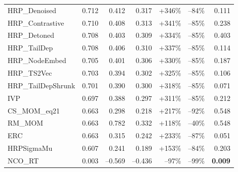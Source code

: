 \documentclass[11pt,a4paper]{article}
\begin{document}
\begin{table}[H]
\begin{tabular}{lrrrrrr}
HRP\_Denoised            & 0.712 & 0.412 & 0.317 & +346\%  & --84\% & 0.111\\
HRP\_Contrastive         & 0.710 & 0.408 & 0.313 & +341\%  & --85\% & 0.238\\
HRP\_Detoned             & 0.708 & 0.403 & 0.309 & +334\%  & --85\% & 0.403\\
HRP\_TailDep             & 0.708 & 0.406 & 0.310 & +337\%  & --85\% & 0.114\\
HRP\_NodeEmbed           & 0.705 & 0.401 & 0.306 & +330\%  & --85\% & 0.187\\
HRP\_TS2Vec              & 0.703 & 0.394 & 0.302 & +325\%  & --85\% & 0.106\\
HRP\_TailDepShrunk       & 0.701 & 0.390 & 0.300 & +318\%  & --85\% & 0.071\\
IVP                      & 0.697 & 0.388 & 0.297 & +311\%  & --85\% & 0.212\\
CS\_MOM\_eq21            & 0.663 & 0.298 & 0.218 & +217\%  & --92\% & 0.548\\
RM\_MOM                  & 0.663 & 0.782 & 0.332 & +118\%  & --40\% & 0.548\\
ERC                      & 0.663 & 0.315 & 0.242 & +233\%  & --87\% & 0.051\\
HRPSigmaMu               & 0.607 & 0.241 & 0.189 & +153\%  & --84\% & 0.203\\
NCO\_RT                  & 0.003 & --0.569 & --0.436 & --97\% & --99\% & \textbf{0.009}\\
\bottomrule
\end{tabular}
\end{table}
\end{document}
